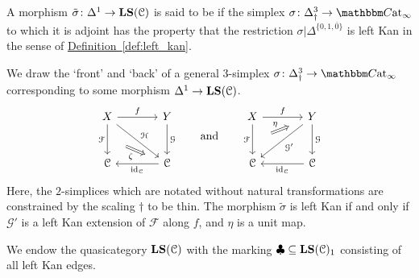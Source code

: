 \documentclass[main.tex]{subfiles}
\begin{document}
\begin{definition}
  \label{def:left_kan_simplex}
  A morphism $\tilde{\sigma}\colon \Delta^{1} \to \mathbf{LS}(\mathcal{C})$ is said to be  if the simplex $\sigma\colon \Delta^{3}_{\dagger} \to \ICCat$ to which it is adjoint has the property that the restriction $\sigma|\Delta^{\{0,1,\overline{0}\}}$ is left Kan in the sense of \hyperref[def:left_kan]{Definition~\ref*{def:left_kan}}.
\end{definition}

We draw the `front' and `back' of a general $3$-simplex $\sigma\colon \Delta^{3}_{\dagger} \to \ICCat$ corresponding to some morphism $\Delta^{1} \to \mathbf{LS}(\mathcal{C})$.
\begin{equation*}
  \begin{tikzcd}[column sep=large, row sep=large]
    X
    \arrow[r, "f"]
    \arrow[d, "\mathcal{F}"{swap}, ""{name=L}]
    \arrow[dr, "\mathcal{H}"]
    & Y
    \arrow[d, "\mathcal{G}"]
    \\
    \category{C}
    & \category{C}
    \arrow[l, "\id_{\category{C}}"]
    \arrow[from=L, Rightarrow, shorten=3ex, "\zeta"{swap}]
  \end{tikzcd}
  \qquad\text{and}\qquad
  \begin{tikzcd}[column sep=large, row sep=large]
    X
    \arrow[r, "f"]
    \arrow[d, "\mathcal{F}"{swap}, ""{name=L}]
    & Y
    \arrow[d, "\mathcal{G}"]
    \arrow[dl, "\mathcal{G}'"]
    \arrow[from=L, Rightarrow, shorten=3ex, "\eta"]
    \\
    \category{C}
    & \category{C}
    \arrow[l, "\id_{\category{C}}"]
  \end{tikzcd}
\end{equation*}
Here, the $2$-simplices which are notated without natural transformations are constrained by the scaling $\dagger$ to be thin. The morphism $\tilde{\sigma}$ is left Kan if and only if $\mathcal{G}'$ is a left Kan extension of $\mathcal{F}$ along $f$, and $\eta$ is a unit map.

\begin{notation}
  We endow the quasicategory $\mathbf{LS}(\mathcal{C})$ with the marking $\clubsuit \subseteq \mathbf{LS}(\mathcal{C})_{1}$ consisting of all left Kan edges.
\end{notation}
\end{document}
